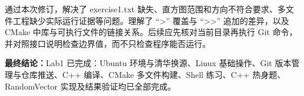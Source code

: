 \documentclass[12pt,a4paper]{ctexart}
\begin{document}
通过本次修订，解决了 exercise1.txt 缺失、直方图范围和方向不符合要求、多文件工程缺少实际运行证据等问题。理解了 ``>'' 覆盖与 ``>>'' 追加的差异，以及 CMake 中库与可执行文件的链接关系。后续应先核对当前目录再执行 Git 命令，并对照接口说明检查边界值，而不只检查程序能否运行。

\textbf{最终结论：}Lab1 已完成：Ubuntu 环境与清华换源、Linux 基础操作、Git 版本管理与仓库推送、C++ 编译、CMake 多文件构建、Shell 练习、C++ 热身题、RandomVector 实现及结果验证均已全部完成。
\end{document}
